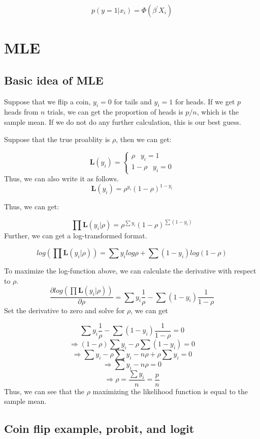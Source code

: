 \documentclass[]{book}
\begin{document}
\[p(y=1|x_i)=\Phi(\beta^{'}X_i)\]

\chapter{MLE}\label{intro}

\section{Basic idea of MLE}\label{basic-idea-of-mle}

Suppose that we flip a coin, \(y_i=0\) for tails and \(y_i=1\) for
heads. If we get \(p\) heads from \(n\) trials, we can get the
proportion of heads is \(p/n\), which is the sample mean. If we do not
do any further calculation, this is our best guess.

Suppose that the true proablity is \(\rho\), then we can get:

\[
\mathbf{L}(y_i)=\begin{cases} \rho \;\;\:   y_i = 1 \\ 1-\rho \;\;\:  y_i = 0 \end{cases}
\] Thus, we can also write it as follows.
\[\mathbf{L}(y_i) = \rho^{y_i}(1-\rho)^{1-y_i}\]

Thus, we can get:

\[\prod \mathbf{L}(y_i|\rho)=\rho^{\sum y_i}(1-\rho)^{\sum(1-y_i)}\]
Further, we can get a log-transformed format.

\[log (\prod \mathbf{L}(y_i|\rho))=\sum y_i log \rho + \sum(1-y_i) log(1-\rho)\]

To maximize the log-function above, we can calculate the derivative with
respect to \(\rho\).
\[\frac{\partial log (\prod \mathbf{L}(y_i|\rho)) }{\partial \rho}=\sum y_i \frac{1}{\rho}-\sum(1-y_i) \frac{1}{1-\rho}\]
Set the derivative to zero and solve for \(\rho\), we can get

\[\sum y_i \frac{1}{\rho}-\sum(1-y_i) \frac{1}{1-\rho}=0\]
\[\Rightarrow (1-\rho)\sum y_i - \rho \sum(1-y_i) =0\]
\[\Rightarrow \sum y_i-\rho\sum y_i - n\rho +\rho\sum y_i =0\]
\[\Rightarrow \sum y_i - n\rho  =0\]
\[\Rightarrow \rho  = \frac{\sum y_i}{n}=\frac{p}{n}\] Thus, we can see
that the \(\rho\) maximizing the likelihood function is equal to the
sample mean.

\section{Coin flip example, probit, and
logit}\label{coin-flip-example-probit-and-logit}
\end{document}
